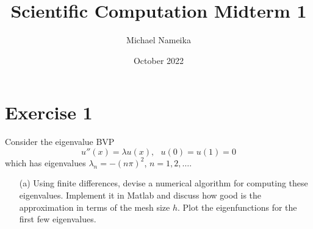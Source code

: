 \documentclass{article}
\title{Scientific Computation Midterm 1}
\author{Michael Nameika}
\date{October 2022}
\begin{document}
\maketitle

\section*{Exercise 1}

Consider the eigenvalue BVP
\[u''(x) = \lambda u(x), \:\:\: u(0) = u(1) = 0\]
which has eigenvalues $\lambda_n = -(n\pi)^2$, $n = 1, 2, \dots$.
\begin{enumerate}
    \item[(a)] Using finite differences, devise a numerical algorithm for computing these eigenvalues. Implement it in Matlab and discuss how good is the approximation in terms of the mesh size $h$. Plot the eigenfunctions for the first few eigenvalues.
    \newline
    

\end{enumerate}
\end{document}
